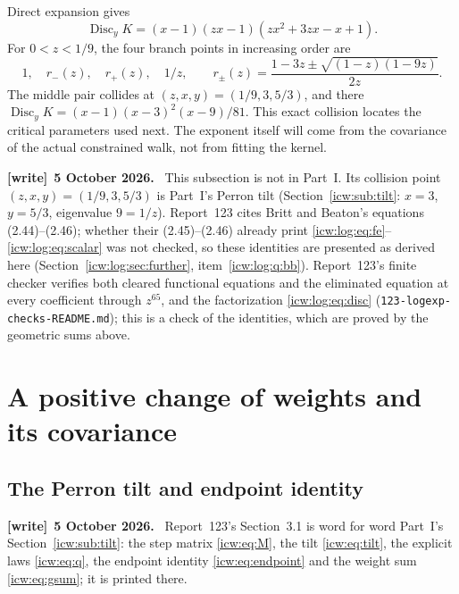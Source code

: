 \documentclass[11pt,letterpaper]{article}
\theoremstyle{remark}\newtheorem{remark}[theorem]{Remark}
\newcommand{\1}{\mathbf1}
\DeclareMathOperator{\Disc}{Disc}
\newenvironment{writenote}[1][]{\par\smallskip\begingroup\small
 \noindent\textbf{[write]}\if\relax\detokenize{#1}\relax\else~\textbf{#1.}\fi\ }%
 {\par\endgroup\smallskip}
\newcommand{\file}[1]{\textup{\nolinkurl{#1}}}
\begin{document}
Direct expansion gives
\begin{equation}\label{icw:log:eq:disc}
 \Disc_y K=(x-1)(zx-1)(zx^2+3zx-x+1).
\end{equation}
For $0<z<1/9$, the four branch points in increasing order are
\[
 1,\quad r_-(z),\quad r_+(z),\quad 1/z,
 \qquad r_\pm(z)=\frac{1-3z\pm\sqrt{(1-z)(1-9z)}}{2z}.
\]
The middle pair collides at $(z,x,y)=(1/9,3,5/3)$, and there
$\Disc_y K=(x-1)(x-3)^2(x-9)/81$. This exact collision locates the
critical parameters used next. The exponent itself will come from the
covariance of the actual constrained walk, not from fitting the kernel.
\begin{writenote}[5 October 2026]
This subsection is not in Part~I. Its collision point $(z,x,y)=(1/9,3,5/3)$ is Part~I's Perron tilt (Section~\ref{icw:sub:tilt}: $x=3$, $y=5/3$, eigenvalue $9=1/z$). Report~123 cites Britt and Beaton's equations (2.44)--(2.46); whether their (2.45)--(2.46) already print \eqref{icw:log:eq:fe}--\eqref{icw:log:eq:scalar} was not checked, so these identities are presented as derived here (Section~\ref{icw:log:sec:further}, item~\ref{icw:log:q:bb}). Report~123's finite checker verifies both cleared functional equations and the eliminated equation at every coefficient through $z^{65}$, and the factorization \eqref{icw:log:eq:disc} (\file{123-logexp-checks-README.md}); this is a check of the identities, which are proved by the geometric sums above.
\end{writenote}

\section{A positive change of weights and its covariance}\label{icw:log:sec:tilt}
\subsection{The Perron tilt and endpoint identity}\label{icw:log:sub:tilt}
\begin{writenote}[5 October 2026]
Report~123's Section~3.1 is word for word Part~I's Section~\ref{icw:sub:tilt}: the step matrix \eqref{icw:eq:M}, the tilt \eqref{icw:eq:tilt}, the explicit laws \eqref{icw:eq:q}, the endpoint identity \eqref{icw:eq:endpoint} and the weight sum \eqref{icw:eq:gsum}; it is printed there.
\end{writenote}
\end{document}
